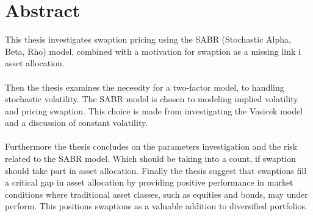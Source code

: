 \section*{Abstract}

This thesis investigates swaption pricing using the SABR (Stochastic Alpha, Beta, Rho) model,
combined with a motivation for swaption as a missing link i asset allocation. 
\\\\
Then the thesis examines the necessity for a two-factor model, to handling stochastic volatility.
The SABR model is chosen to modeling implied volatility and pricing swaption. 
This choice is made from investigating the Vasicek model and a discussion of constant volatility.
\\\\
Furthermore the thesis concludes on the parameters investigation and the risk related to the SABR model. 
Which should be taking into a count, if swaption should take part in asset allocation.
Finally the thesis suggest that swaptions fill a critical gap in asset allocation by providing 
positive performance in market conditions where traditional asset classes, 
such as equities and bonds, may under perform. This positions swaptions as a valuable addition to diversified portfolios.



